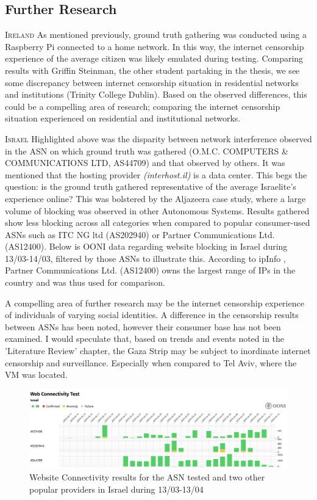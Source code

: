 \subsection{Further Research}
\textsc{Ireland}
As mentioned previously, ground truth gathering was conducted using a Raspberry Pi connected to a home network. In this way, the internet censorship experience of the average citizen was likely emulated during testing. Comparing results with Griffin Steinman, the other student partaking in the thesis, we see some discrepancy between internet censorship situation in residential networks and institutions (Trinity College Dublin). Based on the observed differences, this could be a compelling area of research; comparing the internet censorship situation experienced on residential and institutional networks. 

\textsc{Israel}
Highlighted above was the disparity between network interference observed in the ASN on which ground truth was gathered (O.M.C. COMPUTERS \& COMMUNICATIONS LTD, AS44709) and that observed by others. It was mentioned that the hosting provider \textit{(interhost.il)} is a data center. This begs the question: is the ground truth gathered representative of the average Israelite's experience online? This was bolstered by the Aljazeera case study, where a large volume of blocking was observed in other Autonomous Systems. Results gathered show less blocking across all categories when compared to popular consumer-used ASNs such as ITC NG ltd (AS202940) or Partner Communications Ltd. (AS12400). Below is OONI data regarding website blocking in Israel during 13/03-14/03, filtered by those ASNs to illustrate this. According to ipInfo \cite{ipinfo_israel_asns}, Partner Communications Ltd. (AS12400) owns the largest range of IPs in the country and was thus used for comparison.

A compelling area of further research may be the internet censorship experience of individuals of varying social identities. A difference in the censorship results between ASNs has been noted, however their consumer base has not been examined. I would speculate that, based on trends and events noted in the 'Literature Review' chapter, the Gaza Strip may be subject to inordinate internet censorship and surveillance. Especially when compared to Tel Aviv, where the VM was located.


\begin{figure} [H]
    \centering
    \includegraphics[width=1\linewidth]{ISRWEBASNcomp.png}
    \caption{Website Connectivity results for the ASN tested and two other popular providers in Israel during 13/03-13/04}
    \label{fig:enter-label}
\end{figure}


